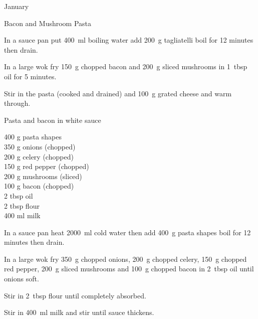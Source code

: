 \begin{menu}{January}
\begin{recipe}{1}{Bacon and Mushroom Pasta}
\begin{ingredients}
		\end{ingredients}
	
    \begin{instructions}
    \item 
      In a
      sauce pan
      put
      400~ml  boiling water
      add
      200~g  tagliatelli
      boil for 12 minutes then drain.
    \item 
        In a large wok fry 150~g chopped bacon
        and
        200~g sliced mushrooms
        in
        1~tbsp  oil for 5 minutes.
      \item 
        Stir in the pasta (cooked and drained)
        and 100~g grated cheese
        and warm through.
      
    \end{instructions}
    \end{recipe}%
  
    \begin{recipe}{2}{Pasta and bacon in white sauce}%
    
		\begin{ingredients}
		400 g pasta shapes  \\
	350 g onions (chopped) \\
	200 g celery (chopped) \\
	150 g red pepper (chopped) \\
	200 g mushrooms (sliced) \\
	100 g bacon (chopped) \\
	2 tbsp oil  \\
	2 tbsp flour  \\
	400 ml milk  \\
	
		\end{ingredients}
	
    \begin{instructions}
    \item 
      In a sauce pan heat
      2000~ml  cold water then add
      400~g  pasta shapes
      boil for 12
      minutes then drain.
    \item 
        In a large wok fry
        350~g chopped onions,
        200~g chopped celery,
        150~g chopped red pepper,
        200~g sliced mushrooms
        and
        100~g chopped bacon
        in
        2~tbsp  oil
        until onions soft.
      \item 
        Stir in
        2~tbsp  flour
        until completely absorbed.
      \item 
        Stir in
        400~ml  milk
        and stir
        until sauce thickens.
      

\end{instructions}
\end{recipe}
\end{menu}
